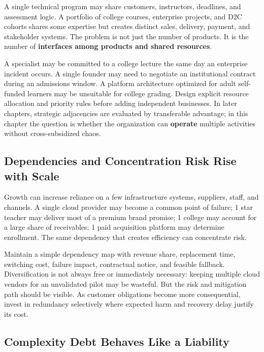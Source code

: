 A single technical program may share customers, instructors, deadlines, and assessment logic. A portfolio of college courses, enterprise projects, and D2C cohorts shares some expertise but creates distinct sales, delivery, payment, and stakeholder systems. The problem is not just the number of products. It is the number of \textbf{interfaces among products and shared resources}.

A specialist may be committed to a college lecture the same day an enterprise incident occurs. A single founder may need to negotiate an institutional contract during an admissions window. A platform architecture optimized for adult self-funded learners may be unsuitable for college grading. Design explicit resource allocation and priority rules before adding independent businesses. In later chapters, strategic adjacencies are evaluated by transferable advantage; in this chapter the question is whether the organization can \textbf{operate} multiple activities without cross-subsidized chaos.

\subsection{Dependencies and Concentration Risk Rise with Scale}
\label{sec:dependencies_concentration_risk}

Growth can increase reliance on a few infrastructure systems, suppliers, staff, and channels. A single cloud provider may become a common point of failure; 1 star teacher may deliver most of a premium brand promise; 1 college may account for a large share of receivables; 1 paid acquisition platform may determine enrollment. The same dependency that creates efficiency can concentrate risk.

Maintain a simple dependency map with revenue share, replacement time, switching cost, failure impact, contractual notice, and feasible fallback. Diversification is not always free or immediately necessary: keeping multiple cloud vendors for an unvalidated pilot may be wasteful. But the risk and mitigation path should be visible. As customer obligations become more consequential, invest in redundancy selectively where expected harm and recovery delay justify its cost.

\subsection{Complexity Debt Behaves Like a Liability}
\label{sec:complexity_debt_liability}

